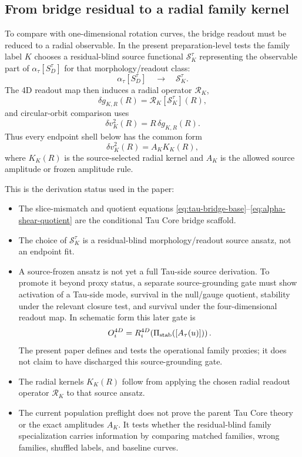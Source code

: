 \documentclass[11pt]{article}
\begin{document}
\subsection{From bridge residual to a radial family kernel}

To compare with one-dimensional rotation curves, the bridge readout must be
reduced to a radial observable.  In the present preparation-level tests the
family label \(K\) chooses a residual-blind source functional
\(\mathcal S_K^\tau\) representing the observable part of
\(\alpha_\tau[S_D^\tau]\) for that morphology/readout class:
\[
\alpha_\tau [S_D^\tau]
\quad\longrightarrow\quad
\mathcal S_K^\tau .
\]
The 4D readout map then induces a radial operator \(\mathcal R_K\),
\[
\delta g_{K,R}(R)
=
\mathcal R_K[\mathcal S_K^\tau](R),
\]
and circular-orbit comparison uses
\begin{equation}
\delta v_K^2(R)=R\,\delta g_{K,R}(R).
\label{eq:radial-velocity-reduction}
\end{equation}
Thus every endpoint shell below has the common form
\[
\delta v_K^2(R)=A_K K_K(R),
\]
where \(K_K(R)\) is the source-selected radial kernel and \(A_K\) is the
allowed source amplitude or frozen amplitude rule.

This is the derivation status used in the paper:
\begin{itemize}[leftmargin=*]
\item The slice-mismatch and quotient equations
\eqref{eq:tau-bridge-base}--\eqref{eq:alpha-shear-quotient} are the
conditional Tau Core bridge scaffold.
\item The choice of \(\mathcal S_K^\tau\) is a residual-blind morphology/readout
source ansatz, not an endpoint fit.
\item A source-frozen ansatz is not yet a full Tau-side source derivation.  To
promote it beyond proxy status, a separate source-grounding gate must show
activation of a Tau-side mode, survival in the null/gauge quotient, stability
under the relevant closure test, and survival under the four-dimensional readout
map.  In schematic form this later gate is
\[
O_i^{4D}=R_i^{4D}\!\left(\Pi_{\rm stab}([A_\tau(u)])\right).
\]
The present paper defines and tests the operational family proxies; it does not
claim to have discharged this source-grounding gate.
\item The radial kernels \(K_K(R)\) follow from applying the chosen radial
readout operator \(\mathcal R_K\) to that source ansatz.
\item The current population preflight does not prove the parent Tau Core
theory or the exact amplitudes \(A_K\).  It tests whether the residual-blind
family specialization carries information by comparing matched families,
wrong families, shuffled labels, and baseline curves.
\end{itemize}
\end{document}
